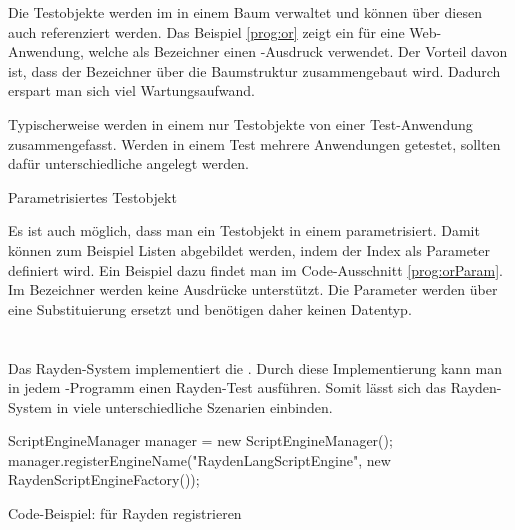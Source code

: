 \SuperPar
Die Testobjekte werden im  in einem Baum verwaltet und können über diesen auch referenziert werden. Das Beispiel \ref{prog:or} zeigt ein  für eine Web-Anwendung, welche als Bezeichner einen -Ausdruck verwendet.  Der Vorteil davon ist, dass der Bezeichner  über die Baumstruktur zusammengebaut wird. Dadurch erspart man sich viel Wartungsaufwand. 

\SuperPar
Typischerweise werden in einem  nur Testobjekte von einer Test-Anwendung zusammengefasst. Werden in einem Test mehrere Anwendungen getestet, sollten dafür unterschiedliche  angelegt werden.

\begin{program}
\caption{Parametrisiertes Testobjekt}
\label{prog:orParam}
\end{program}

\SuperPar
Es ist auch möglich, dass man ein Testobjekt in einem  parametrisiert. Damit können zum Beispiel Listen abgebildet werden, indem der Index als Parameter definiert wird. Ein Beispiel dazu findet man im Code-Ausschnitt \ref{prog:orParam}. Im Bezeichner  werden keine Ausdrücke unterstützt. Die Parameter werden über eine Substituierung ersetzt und benötigen daher keinen Datentyp.


\section{}

Das Rayden-System implementiert die . Durch diese Implementierung kann man in jedem -Programm einen Rayden-Test ausführen. Somit lässt sich das Rayden-System in viele unterschiedliche Szenarien einbinden. 

\begin{program}
\begin{JavaCode}
ScriptEngineManager manager = new ScriptEngineManager();
manager.registerEngineName("RaydenLangScriptEngine", new RaydenScriptEngineFactory());
\end{JavaCode}
\caption{Code-Beispiel:  für Rayden registrieren}
\label{prog:registerFactory}
\end{program}

